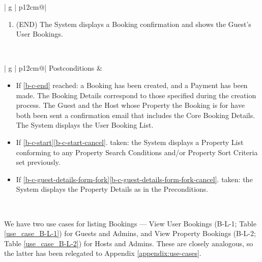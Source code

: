 \begin{table}[H]
\begin{tabular}{| g | p{12cm}@\qquad |}
\begin{enumerate}
\begin{enumerate}
\begin{enumerate}
                    \end{enumerate}
                    \item If not: the System displays a notification about the failed Payment. Return to \ref{b-c-guest-details-form-fork}.
                \end{enumerate}
            \item \label{b-c-end} (END) The System displays a Booking confirmation and shows the Guest's User Bookings. 
            \vspace{-0.4cm} 
        \end{enumerate} 
        \\ \hline
    \end{tabular}
    \caption{Use Case B-C: Make Booking}
    \label{use_case_b-c}
  \end{table}

  \begin{table}[H]
    \centering
    \footnotesize
    \begin{tabular}{| g | p{12cm}@\qquad |}
        \hline
        \vspace{-0.3cm} 
        Postconditions &
        \begin{itemize}
            \item If \ref{b-c-end} reached: a Booking has been created, and a Payment has been made. The Booking Details correspond to those specified during the creation process. The Guest and the Host whose Property the Booking is for have both been sent a confirmation email that includes the Core Booking Details. The System displays the User Booking List.
            \item If \ref{b-c-start}\ref{b-c-start-cancel}. taken: the System displays a Property List conforming to any Property Search Conditions and/or Property Sort Criteria set previously.
            \item If \ref{b-c-guest-details-form-fork}\ref{b-c-guest-details-form-fork-cancel}. taken: the System displays the Property Details as in the Preconditions.
        \end{itemize}
         \\ \hline
    \end{tabular}
    \caption{Use Case B-C: Make Booking (continued)}
    \label{use_case_b-c_cont}
\end{table}

We have two use cases for listing Bookings --- View User Bookings (B-L-1; Table \ref{use_case_B-L-1}) for Guests and Admins, and View Property Bookings (B-L-2; Table \ref{use_case_B-L-2}) for Hosts and Admins. These are closely analogous, so the latter has been relegated to Appendix \ref{appendix:use-cases}.


